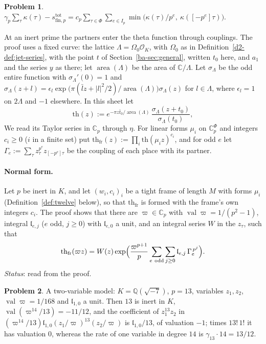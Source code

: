 \documentclass[reqno]{amsart}
\theoremstyle{definition}
\newtheorem{problem}{Problem}[section]
\theoremstyle{plain}
\newcommand{\Q}{\mathbb{Q}}
\newcommand{\C}{\mathbb{C}}
\newcommand{\Oc}{\mathcal{O}}
\newcommand{\val}{\operatorname{val}}
\newcommand{\stot}{s^{\mathrm{tot}}_{\mathrm{fin},p}}
\newcommand{\tth}{\mathrm{th}}
\newcommand{\thfr}{\mathrm{th}_{\mathrm{fr}}}
\begin{document}
\begin{problem}\label{pr:partners}
\(\gamma_p \sum_{\tau} \kappa(\tau) - \stot = c_p \sum_{\tau \in \Phi} \sum_{e \in I_p} \min\bigl(\kappa(\tau)/p^e,\ \kappa([-p^e]\tau)\bigr)\).
\end{problem}

At an inert prime the partners enter the theta function through couplings.  The proof uses a fixed curve: the lattice \(\Lambda = \Omega_0\Oc_K\), with \(\Omega_0\) as in Definition~\ref{d2-def:jet-series}, with the point \(t\) of Section~\ref{ba-sec:general}, written \(t_0\) here, and \(a_1\) and the series \(y\) as there; let \(\operatorname{area}(\Lambda)\) be the area of \(\C/\Lambda\).  Let \(\sigma_\Lambda\) be the odd entire function with \(\sigma_\Lambda'(0) = 1\) and \(\sigma_\Lambda(z + l) = \epsilon_l \exp\bigl(\pi(\bar l z + \lvert l\rvert^2/2)/\operatorname{area}(\Lambda)\bigr)\sigma_\Lambda(z)\) for \(l \in \Lambda\), where \(\epsilon_l = 1\) on \(2\Lambda\) and \(-1\) elsewhere.  In this sheet let
\[
  \tth(z) := e^{-\pi z\bar t_0/\operatorname{area}(\Lambda)}\, \frac{\sigma_\Lambda(z + t_0)}{\sigma_\Lambda(t_0)} ,
\]
We read its Taylor series in \(\C_p\) through \(\eta\).  For linear forms \(\mu_i\) on \(\C_p^{\Phi}\) and integers \(c_i \ge 0\) (\(i\) in a finite set) put \(\thfr(z) := \prod_i \tth(\mu_i z)^{c_i}\), and for odd \(e\) let \(\Gamma_e := \sum_{\tau} z_\tau^{p^e} z_{[-p^e]\tau}\) be the coupling of each place with its partner.

\paragraph{Normal form.}  Let \(p\) be inert in \(K\), and let \((w_i,c_i)_i\) be a tight frame of length \(M\) with forms \(\mu_i\) (Definition~\ref{def:twelve} below), so that \(\thfr\) is formed with the frame's own integers \(c_i\).  The proof shows that there are \(\varpi \in \C_p\) with \(\val\varpi = 1/(p^2-1)\), integral \(\mathfrak l_{e,j}\) (\(e\) odd, \(j \ge 0\)) with \(\mathfrak l_{e,0}\) a unit, and an integral series \(W\) in the \(z_\tau\), such that
\[
  \thfr(\varpi z) = W(z) \exp\Bigl(\frac{\varpi^{p+1}}{p} \sum_{e\ \mathrm{odd}} \sum_{j \ge 0} \mathfrak l_{e,j}\, \Gamma_e^{\,p^j}\Bigr) .
\]
\emph{Status}: read from the proof.

\begin{problem}\label{pr:coupled-pair}
A two-variable model: \(K = \Q(\sqrt{-7})\), \(p = 13\), variables \(z_1, z_2\), \(\val\varpi = 1/168\) and \(\mathfrak l_{1,0}\) a unit.  Then \(13\) is inert in \(K\), \(\val(\varpi^{14}/13) = -11/12\), and the coefficient of \(z_1^{13}z_2\) in \((\varpi^{14}/13)\mathfrak l_{1,0}(z_1/\varpi)^{13}(z_2/\varpi)\) is \(\mathfrak l_{1,0}/13\), of valuation \(-1\); times \(13!\,1!\) it has valuation \(0\), whereas the rate of one variable in degree \(14\) is \(\gamma_{13}\cdot 14 = 13/12\).
\end{problem}
\end{document}
